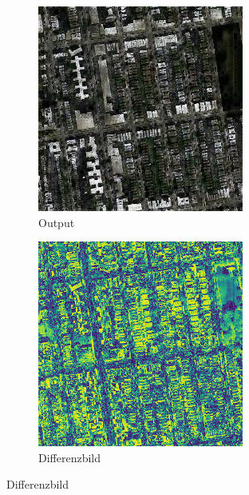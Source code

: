 \begin{figure}[ht]
\begin{subfigure}[t]{.14\textwidth}
  \end{subfigure}
  \begin{subfigure}[t]{.14\textwidth}
    \centering
    \caption*{Output}
    \includegraphics[width=\linewidth]{images/cycleGanResults/Satelite19Ld120_E100_Lr0002.jpg}
  \end{subfigure}
  \begin{subfigure}[t]{.14\textwidth}
    \centering
    \caption*{Differenzbild}
    \includegraphics[width=\linewidth]{images/cycleGanResults/Satelite2_diff.png}
  \end{subfigure}


\end{figure}

